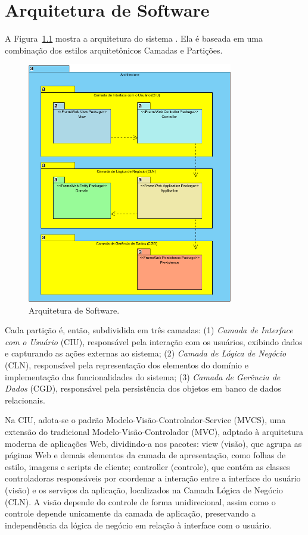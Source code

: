 
\chapter{Arquitetura de Software}
\label{sec-arquitetura}
\vspace{-1cm}

A Figura~\ref{figura-arquitetura} mostra a arquitetura do sistema \emph{\imprimirtitulo}. Ela é baseada em uma combinação dos estilos arquitetônicos Camadas e Partições.

\begin{figure}[h]
	\centering
	\includegraphics[width=0.8\textwidth]{figuras/architecture.png}
	\caption{Arquitetura de Software.}
	\label{figura-arquitetura}
\end{figure}

Cada partição é, então, subdividida em três camadas: (1) \textit{Camada de Interface com o Usuário} (CIU), responsável pela interação com os usuários, exibindo dados e capturando as ações externas ao sistema; (2) \textit{Camada de Lógica de Negócio} (CLN), responsável pela representação dos elementos do domínio e implementação das funcionalidades do sistema; (3) \textit{Camada de Gerência de Dados} (CGD), responsável pela persistência dos objetos em banco de dados relacionais.

Na CIU, adota-se o padrão Modelo-Visão-Controlador-Service (MVCS), uma extensão do tradicional Modelo-Visão-Controlador (MVC), adptado à arquitetura moderna de aplicações Web, dividindo-a nos pacotes: \textsf{view} (visão), que agrupa as páginas Web e demais elementos da camada de apresentação, como folhas de estilo, imagens e scripts de cliente; \textsf{controller} (controle), que contém as classes controladoras responsáveis por coordenar a interação entre a interface do usuário (visão) e os serviços da aplicação, localizados na Camada Lógica de Negócio (CLN). A visão depende do controle de forma unidirecional, assim como o controle depende unicamente da camada de aplicação, preservando a independência da lógica de negócio em relação à interface com o usuário.

